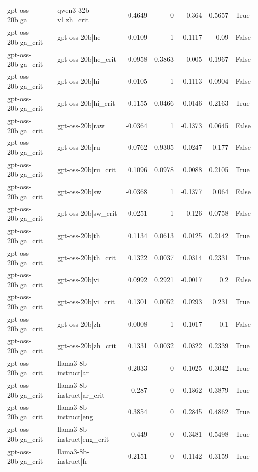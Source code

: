 \begin{table}
\begin{tabular}{l l r r r r l}
gpt-oss-20b|ga & qwen3-32b-v1|zh_crit & 0.4649 & 0 & 0.364 & 0.5657 & True \\
gpt-oss-20b|ga_crit & gpt-oss-20b|he & -0.0109 & 1 & -0.1117 & 0.09 & False \\
gpt-oss-20b|ga_crit & gpt-oss-20b|he_crit & 0.0958 & 0.3863 & -0.005 & 0.1967 & False \\
gpt-oss-20b|ga_crit & gpt-oss-20b|hi & -0.0105 & 1 & -0.1113 & 0.0904 & False \\
gpt-oss-20b|ga_crit & gpt-oss-20b|hi_crit & 0.1155 & 0.0466 & 0.0146 & 0.2163 & True \\
gpt-oss-20b|ga_crit & gpt-oss-20b|raw & -0.0364 & 1 & -0.1373 & 0.0645 & False \\
gpt-oss-20b|ga_crit & gpt-oss-20b|ru & 0.0762 & 0.9305 & -0.0247 & 0.177 & False \\
gpt-oss-20b|ga_crit & gpt-oss-20b|ru_crit & 0.1096 & 0.0978 & 0.0088 & 0.2105 & True \\
gpt-oss-20b|ga_crit & gpt-oss-20b|sw & -0.0368 & 1 & -0.1377 & 0.064 & False \\
gpt-oss-20b|ga_crit & gpt-oss-20b|sw_crit & -0.0251 & 1 & -0.126 & 0.0758 & False \\
gpt-oss-20b|ga_crit & gpt-oss-20b|th & 0.1134 & 0.0613 & 0.0125 & 0.2142 & True \\
gpt-oss-20b|ga_crit & gpt-oss-20b|th_crit & 0.1322 & 0.0037 & 0.0314 & 0.2331 & True \\
gpt-oss-20b|ga_crit & gpt-oss-20b|vi & 0.0992 & 0.2921 & -0.0017 & 0.2 & False \\
gpt-oss-20b|ga_crit & gpt-oss-20b|vi_crit & 0.1301 & 0.0052 & 0.0293 & 0.231 & True \\
gpt-oss-20b|ga_crit & gpt-oss-20b|zh & -0.0008 & 1 & -0.1017 & 0.1 & False \\
gpt-oss-20b|ga_crit & gpt-oss-20b|zh_crit & 0.1331 & 0.0032 & 0.0322 & 0.2339 & True \\
gpt-oss-20b|ga_crit & llama3-8b-instruct|ar & 0.2033 & 0 & 0.1025 & 0.3042 & True \\
gpt-oss-20b|ga_crit & llama3-8b-instruct|ar_crit & 0.287 & 0 & 0.1862 & 0.3879 & True \\
gpt-oss-20b|ga_crit & llama3-8b-instruct|eng & 0.3854 & 0 & 0.2845 & 0.4862 & True \\
gpt-oss-20b|ga_crit & llama3-8b-instruct|eng_crit & 0.449 & 0 & 0.3481 & 0.5498 & True \\
gpt-oss-20b|ga_crit & llama3-8b-instruct|fr & 0.2151 & 0 & 0.1142 & 0.3159 & True \\

\end{tabular}
\end{table}
